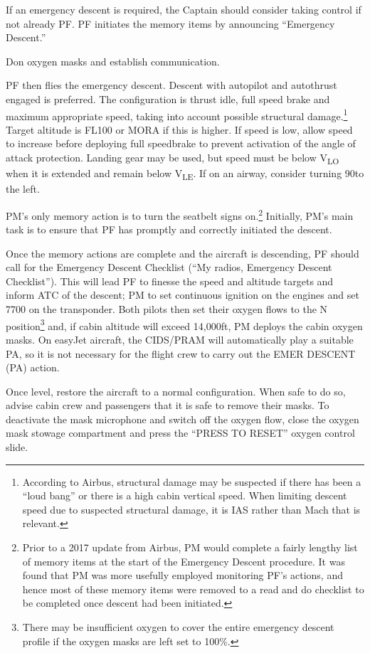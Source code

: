 \documentclass[a5paper,11pt,twoside]{book}
\newcommand{\V}[1]{V\textsubscript{#1}}
\begin{document}
If an emergency descent is required, the Captain should consider taking control
if not already PF. PF initiates the memory items by announcing “Emergency
Descent.”

Don oxygen masks and establish communication.

PF then flies the emergency descent.  Descent with autopilot and autothrust
engaged is preferred. The configuration is thrust idle, full speed brake and
maximum appropriate speed, taking into account possible structural
damage.\footnote{According to Airbus, structural damage may be suspected if
there has been a “loud bang” or there is a high cabin vertical speed. When
limiting descent speed due to suspected structural damage, it is IAS rather than
Mach that is relevant.} Target altitude is FL100 or MORA if this is higher. If
speed is low, allow speed to increase before deploying full speedbrake to
prevent activation of the angle of attack protection. Landing gear may be used,
but speed must be below \V{LO} when it is extended and remain below \V{LE}. If
on an airway, consider turning 90\textdegree{ }to the left.

PM’s only memory action is to turn the seatbelt signs on.\footnote{Prior to a
2017 update from Airbus, PM would complete a fairly lengthy list of memory items
at the start of the Emergency Descent procedure. It was found that PM was more
usefully employed monitoring PF’s actions, and hence most of these memory items
were removed to a read and do checklist to be completed once descent had been
initiated.} Initially, PM’s main task is to ensure that PF has promptly and
correctly initiated the descent.

Once the memory actions are complete and the aircraft is descending, PF should
call for the Emergency Descent Checklist (“My radios, Emergency Descent
Checklist”). This will lead PF to finesse the speed and altitude targets and
inform ATC of the descent; PM to set continuous ignition on the engines and set
7700 on the transponder. Both pilots then set their oxygen flows to the N
position\footnote{There may be insufficient oxygen to cover the entire emergency
descent profile if the oxygen masks are left set to 100\%.} and, if cabin
altitude will exceed 14,000ft, PM deploys the cabin oxygen masks. On easyJet
aircraft, the CIDS/PRAM will automatically play a suitable PA, so it is not
necessary for the flight crew to carry out the EMER DESCENT (PA) action.

Once level, restore the aircraft to a normal configuration. When safe to do so,
advise cabin crew and passengers that it is safe to remove their masks. To
deactivate the mask microphone and switch off the oxygen flow, close the oxygen
mask stowage compartment and press the “PRESS TO RESET” oxygen control slide.
\end{document}

